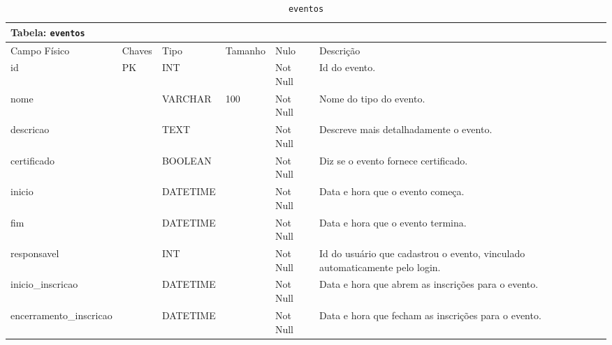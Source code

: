 \documentclass[12pt,a4paper]{article}
\begin{document}
\begin{center}
\begin{table}[h!]
	\caption{\texttt{eventos}}
	\label{tabela:eventos}
	\begin{tabular}{|p{2.5cm}|p{1cm}|p{1.25cm}|p{1.75cm}|p{1.25cm}|p{5cm}|}\hline	
		\multicolumn{6}{|p{16cm}|}{\cellcolor{cinzaClaro}  \centering Tabela: \texttt{eventos}} \\ \hline %
		{\small Campo Físico}   & {\small Chaves} & {\small Tipo} & {\small Tamanho} & {\small Nulo} & {\small Descrição}\\\hline %
		
		{\tiny id} & {\tiny PK} & {\tiny INT} & {\tiny } & {\tiny Not Null} &{\tiny Id do evento.}\\\hline
		{\tiny nome} & {\tiny } & {\tiny VARCHAR} & {\tiny 100} & {\tiny Not Null} &{\tiny Nome do tipo do evento.}\\\hline
		{\tiny descricao} & {\tiny } & {\tiny TEXT} & {\tiny } & {\tiny Not Null} &{\tiny Descreve mais detalhadamente o evento.}\\\hline
		{\tiny certificado} & {\tiny } & {\tiny BOOLEAN} & {\tiny } & {\tiny Not Null} &{\tiny Diz se o evento fornece certificado.}\\\hline
		{\tiny inicio} & {\tiny } & {\tiny DATETIME} & {\tiny } & {\tiny Not Null} &{\tiny Data e hora que o evento começa.}\\\hline
		{\tiny fim} & {\tiny } & {\tiny DATETIME} & {\tiny } & {\tiny Not Null} &{\tiny Data e hora que o evento termina.}\\\hline
		{\tiny responsavel} & {\tiny } & {\tiny INT} & {\tiny } & {\tiny Not Null} &{\tiny Id do usuário que cadastrou o evento, vinculado automaticamente pelo login.}\\\hline
		{\tiny inicio\_inscricao} & {\tiny } & {\tiny DATETIME} & {\tiny } & {\tiny Not Null} &{\tiny Data e hora que abrem as inscrições para o evento.}\\\hline
		{\tiny encerramento\_inscricao} & {\tiny } & {\tiny DATETIME} & {\tiny } & {\tiny Not Null} &{\tiny Data e hora que fecham as inscrições para o evento.}\\\hline
		
			
	\end{tabular}
\end{table}	
\end{center}
\end{document}
